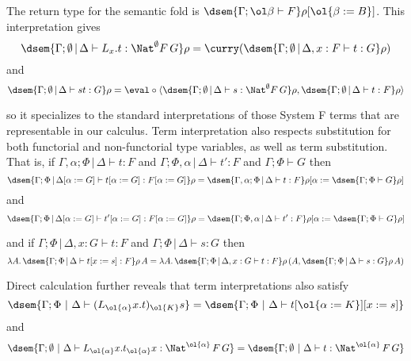 \documentclass{lmcs}
\theoremstyle{plain}\newtheorem{satz}[thm]{Satz}
\begin{document}
The return type for the semantic fold is
  $\dsem{\Gamma;\ol\beta \vdash F}\rho[\ol{\beta := B}]$.
This interpretation gives
\[\dsem{\Gamma;\emptyset \,|\, \Delta
  \vdash L_\empty x. t : \Nat^\emptyset F\, G}\rho = \curry
  (\dsem{\Gamma;\emptyset \,|\, \Delta, x : F \vdash t :
  G}\rho)\]
and
\[\dsem{\Gamma;\emptyset \,|\, \Delta \vdash st:
    G} \rho = \eval \circ \langle \dsem{\Gamma;\emptyset \,|\, \Delta
  \vdash s: \Nat^\emptyset F\, G}\rho, \dsem{\Gamma;\emptyset \,|\, \Delta \vdash
  t: F}\rho \rangle\]

\vspace*{0.05in}

\noindent
so it specializes to the standard interpretations of those System F
terms that are representable in our calculus.  Term interpretation
also respects substitution for both functorial and non-functorial type
variables, as well as term substitution. That is, if
$\Gamma,\alpha;\Phi \,|\, \Delta \vdash t : F$ and $\Gamma;\Phi,\alpha
\,|\, \Delta \vdash t' : F$ and $\Gamma;\Phi \vdash G$ then
\[\dsem{\Gamma;\Phi \,|\, \Delta[\alpha := G] \vdash t[\alpha :=
    G] : F[\alpha := G]}\rho = \dsem{\Gamma,\alpha;\Phi \,|\, \Delta
  \vdash t : F }\rho [ \alpha := \dsem{\Gamma;\Phi\vdash G}\rho ]\]
and
\[\dsem{\Gamma;\Phi \,|\, \Delta[\alpha := G] \vdash t'[\alpha :=
    G] : F[\alpha := G]}\rho = \dsem{\Gamma;\Phi,\alpha \,|\, \Delta
  \vdash t' : F }\rho [ \alpha := \dsem{\Gamma;\Phi\vdash G}\rho ]\]

\vspace*{0.05in}

\noindent
and if $\Gamma;\Phi \,|\, \Delta, x: G \vdash t : F$ and $\Gamma;\Phi
\,|\, \Delta \vdash s : G$ then
\[\lambda A.\, \dsem{\Gamma;\Phi \,|\, \Delta \vdash t[x := s] :
  F }\rho \, A = \lambda A.\,\dsem{\Gamma;\Phi \,|\, \Delta, x: G
  \vdash t : F}\rho \,(A, \dsem{\Gamma;\Phi \,|\, \Delta\vdash s:
  G}\rho\, A)\]

\vspace*{0.05in}

\noindent
Direct calculation further reveals that term interpretations also
satisfy
\[\dsem{\Gamma; \Phi~|~\Delta \vdash
  (L_{\ol{\alpha}}x.t)_{\ol{K}}s} = \dsem{\Gamma; \Phi~|~\Delta \vdash
  t [\ol{\alpha := K}][x := s]}\]
and
\[\dsem{\Gamma; \emptyset~|~\Delta \vdash L_{\ol{\alpha}} x.t_{\ol{\alpha}} x :
   \Nat^{\ol{\alpha}}\, F\, G} = \dsem{\Gamma; \emptyset~|~\Delta
  \vdash t : \Nat^{\ol{\alpha}}\, F\, G}\]

\end{document}
